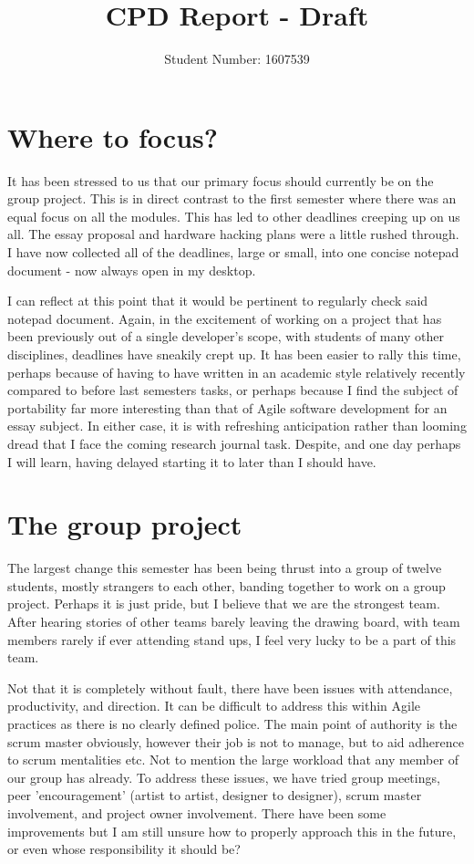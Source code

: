 \documentclass{scrartcl}
\title{CPD Report - Draft}
\author{Student Number: 1607539}
\begin{document}
\maketitle

\section*{Where to focus?}

It has been stressed to us that our primary focus should currently be on the group project. This is in direct contrast to the first semester where there was an equal focus on all the modules. This has led to other deadlines creeping up on us all. The essay proposal and hardware hacking plans were a little rushed through. I have now collected all of the deadlines, large or small, into one concise notepad document - now always open in my desktop.

I can reflect at this point that it would be pertinent to regularly check said notepad document. Again, in the excitement of working on a project that has been previously out of a single developer's scope, with students of many other disciplines, deadlines have sneakily crept up. It has been easier to rally this time, perhaps because of having to have written in an academic style relatively recently compared to before last semesters tasks, or perhaps because I find the subject of portability far more interesting than that of Agile software development for an essay subject. In either case, it is with refreshing anticipation rather than looming dread that I face the coming research journal task. Despite, and one day perhaps I will learn, having delayed starting it to later than I should have.

\section*{The group project}

The largest change this semester has been being thrust into a group of twelve students, mostly strangers to each other, banding together to work on a group project. Perhaps it is just pride, but I believe that we are the strongest team. After hearing stories of other teams barely leaving the drawing board, with team members rarely if ever attending stand ups, I feel very lucky to be a part of this team.

Not that it is completely without fault, there have been issues with attendance, productivity, and direction. It can be difficult to address this within Agile practices as there is no clearly defined police. The main point of authority is the scrum master obviously, however their job is not to manage, but to aid adherence to scrum mentalities etc. Not to mention the large workload that any member of our group has already. To address these issues, we have tried group meetings, peer 'encouragement' (artist to artist, designer to designer), scrum master involvement, and project owner involvement. There have been some improvements but I am still unsure how to properly approach this in the future, or even whose responsibility it should be?
\end{document}
